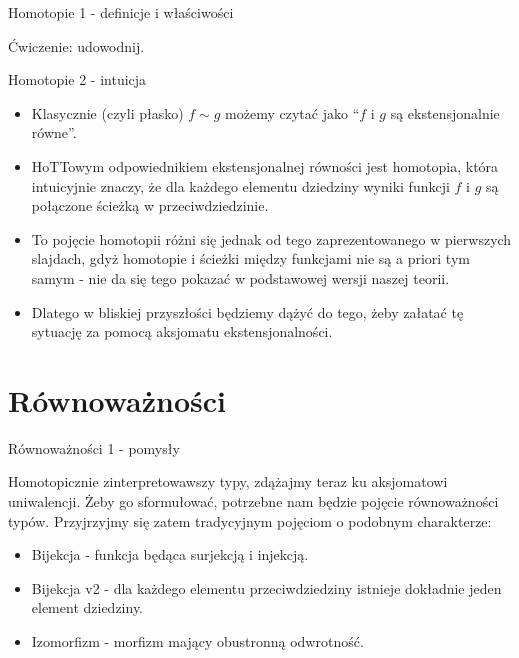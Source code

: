\documentclass{beamer}
\begin{document}
\begin{frame}{Homotopie 1 - definicje i właściwości}


Ćwiczenie: udowodnij.

\end{frame}

\begin{frame}{Homotopie 2 - intuicja}
\begin{itemize}
	\item Klasycznie (czyli płasko) $f \sim g$ możemy czytać jako ``$f$ i $g$ są ekstensjonalnie równe''.
	\item HoTTowym odpowiednikiem ekstensjonalnej równości jest homotopia, która intuicyjnie znaczy, że dla każdego elementu dziedziny wyniki funkcji $f$ i $g$ są połączone ścieżką w przeciwdziedzinie.
	\item To pojęcie homotopii różni się jednak od tego zaprezentowanego w pierwszych slajdach, gdyż homotopie i ścieżki między funkcjami nie są a priori tym samym - nie da się tego pokazać w podstawowej wersji naszej teorii.
	\item Dlatego w bliskiej przyszłości będziemy dążyć do tego, żeby załatać tę sytuację za pomocą aksjomatu ekstensjonalności.
\end{itemize}
\end{frame}

\section{Równoważności}

\begin{frame}{Równoważności 1 - pomysły}

Homotopicznie zinterpretowawszy typy, zdążajmy teraz ku aksjomatowi uniwalencji. Żeby go sformułować, potrzebne nam będzie pojęcie równoważności typów. Przyjrzyjmy się zatem tradycyjnym pojęciom o podobnym charakterze:

\begin{itemize}
	\item Bijekcja - funkcja będąca surjekcją i injekcją.
	\item Bijekcja v2 - dla każdego elementu przeciwdziedziny istnieje dokładnie jeden element dziedziny.
	\item Izomorfizm - morfizm mający obustronną odwrotność.
\end{itemize}
\end{frame}
\end{document}
